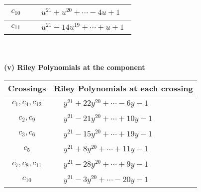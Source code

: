 \documentclass[1p]{elsarticle_modified}
\theoremstyle{definition}
\begin{document}
\begin{tabular}{m{50pt}|m{274pt}}
\hline $$\begin{aligned}c_{10}\end{aligned}$$&$\begin{aligned}
&u^{21}+u^{20}+\cdots-4 u+1
\end{aligned}$\\
\hline $$\begin{aligned}c_{11}\end{aligned}$$&$\begin{aligned}
&u^{21}-14 u^{19}+\cdots+u+1
\end{aligned}$\\
\hline
\end{tabular}\\~\\
\newpage\renewcommand{\arraystretch}{1}
\flushleft \textbf{(v) Riley Polynomials at the component}\newline \\
\begin{tabular}{m{50pt}|m{274pt}}
Crossings & \hspace{64pt}Riley Polynomials at each crossing \\
\hline $$\begin{aligned}c_{1},c_{4},c_{12}\end{aligned}$$&$\begin{aligned}
&y^{21}+22 y^{20}+\cdots-6 y-1
\end{aligned}$\\
\hline $$\begin{aligned}c_{2},c_{9}\end{aligned}$$&$\begin{aligned}
&y^{21}-21 y^{20}+\cdots+10 y-1
\end{aligned}$\\
\hline $$\begin{aligned}c_{3},c_{6}\end{aligned}$$&$\begin{aligned}
&y^{21}-15 y^{20}+\cdots+19 y-1
\end{aligned}$\\
\hline $$\begin{aligned}c_{5}\end{aligned}$$&$\begin{aligned}
&y^{21}+8 y^{20}+\cdots+11 y-1
\end{aligned}$\\
\hline $$\begin{aligned}c_{7},c_{8},c_{11}\end{aligned}$$&$\begin{aligned}
&y^{21}-28 y^{20}+\cdots+9 y-1
\end{aligned}$\\
\hline $$\begin{aligned}c_{10}\end{aligned}$$&$\begin{aligned}
&y^{21}-3 y^{20}+\cdots-20 y-1
\end{aligned}$\\
\hline
\end{tabular}\\~\\
\end{document}
